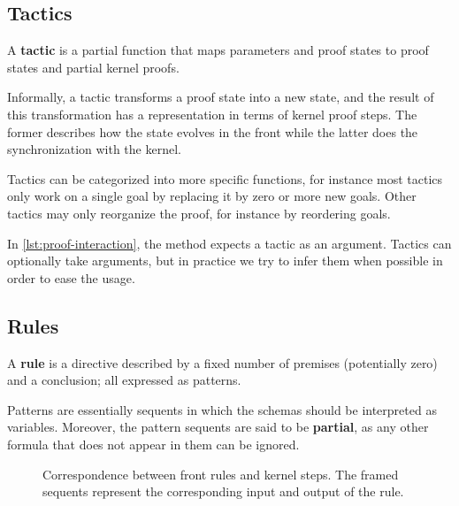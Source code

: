 \subsection{Tactics}

\begin{definition}[Tactic]
A \textbf{tactic} is a partial function that maps parameters and proof states to proof states and partial kernel proofs.
\end{definition}

Informally, a tactic transforms a proof state into a new state, and the result of this transformation has a representation in terms of kernel proof steps. The former describes how the state evolves in the front while the latter does the synchronization with the kernel.

Tactics can be categorized into more specific functions, for instance most tactics only work on a single goal by replacing it by zero or more new goals. Other tactics may only reorganize the proof, for instance by reordering goals.

In \autoref{lst:proof-interaction}, the method  expects a tactic as an argument. Tactics can optionally take arguments, but in practice we try to infer them when possible in order to ease the usage.

\subsection{Rules}
\label{sec:proof-framework-rules}

\begin{definition}[Rule]
A \textbf{rule} is a directive described by a fixed number of premises (potentially zero) and a conclusion; all expressed as patterns.
\end{definition}

Patterns are essentially sequents in which the schemas should be interpreted as variables. Moreover, the pattern sequents are said to be \textbf{partial}, as any other formula that does not appear in them can be ignored.

\begin{figure}[hbt!]
  \centering
  \caption[Correspondence between front rules and kernel steps]{Correspondence between front rules and kernel steps. The framed sequents represent the corresponding input and output of the rule.}
  \label{fig:example-rule}
\end{figure}

